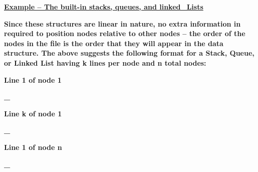 \documentclass[12pt]{article}
\begin{document}
\begin{flushleft}

\end{flushleft}

\begin{flushleft}
\textbf{\uline{{\footnotesize{}Example -- The built-in stacks, queues, and linked\_Lists}}}\textbf{{\footnotesize{} }}
\end{flushleft}


\setlength{\oddsidemargin}{1.0000in-1in}
\setlength{\textwidth}{\paperwidth - 1.0000in-1.0000in}

\begin{flushleft}
\textbf{{\footnotesize{}Since these structures are linear in nature, no extra information in required to position nodes relative to other nodes -- the order of the nodes in the file is the order that they will appear in the data structure.  The above suggests the following format for a Stack, Queue, or Linked List having k lines per node and n total nodes:}}
\end{flushleft}

\begin{flushleft}

\end{flushleft}

\begin{flushleft}
\textbf{{\footnotesize{}      Line 1 of node 1}}
\end{flushleft}

\begin{flushleft}
\textbf{{\footnotesize{}        \_}}
\end{flushleft}

\begin{flushleft}
\textbf{{\footnotesize{}      Line k of node 1}}
\end{flushleft}

\begin{flushleft}
\textbf{{\footnotesize{}        \_}}
\end{flushleft}

\begin{flushleft}
\textbf{{\footnotesize{}      Line 1 of node  n}}
\end{flushleft}

\begin{flushleft}
\textbf{{\footnotesize{}        \_}}
\end{flushleft}
\end{document}
